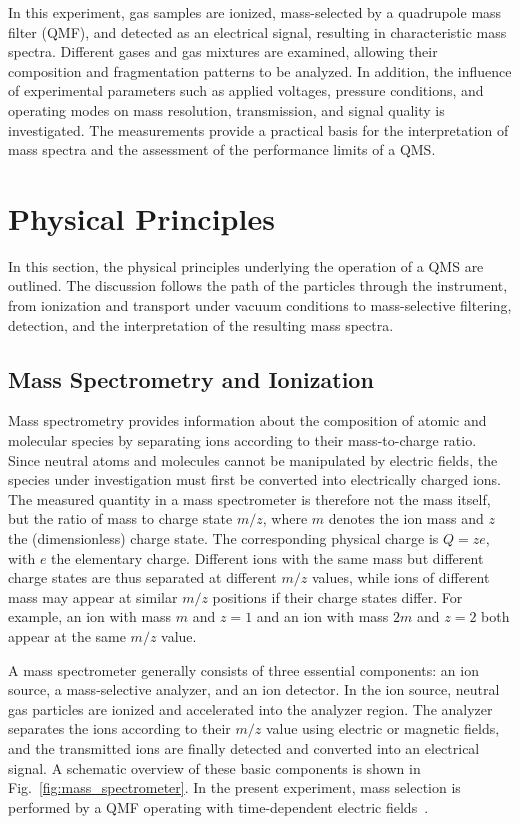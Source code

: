 \documentclass[a4paper]{article}
\begin{document}
In this experiment, gas samples are ionized, mass-selected by a quadrupole mass filter (QMF), and detected as an electrical signal, resulting in characteristic mass spectra.
Different gases and gas mixtures are examined, allowing their composition and fragmentation patterns to be analyzed.
In addition, the influence of experimental parameters such as applied voltages, pressure conditions, and operating modes on mass resolution, transmission, and signal quality is investigated.
The measurements provide a practical basis for the interpretation of mass spectra and the assessment of the performance limits of a QMS.

\section{Physical Principles}

In this section, the physical principles underlying the operation of a QMS are outlined.
The discussion follows the path of the particles through the instrument, from ionization and transport under vacuum conditions to mass-selective filtering, detection, and the interpretation of the resulting mass spectra.

\subsection{Mass Spectrometry and Ionization}

Mass spectrometry provides information about the composition of atomic and molecular species by separating ions according to their mass-to-charge ratio.
Since neutral atoms and molecules cannot be manipulated by electric fields, the species under investigation must first be converted into electrically charged ions.
The measured quantity in a mass spectrometer is therefore not the mass itself, but the ratio of mass to charge state $m/z$, where $m$ denotes the ion mass and $z$ the (dimensionless) charge state.
The corresponding physical charge is $Q = ze$, with $e$ the elementary charge.
Different ions with the same mass but different charge states are thus separated at different $m/z$ values, while ions of different mass may appear at similar $m/z$ positions if their charge states differ.
For example, an ion with mass $m$ and $z=1$ and an ion with mass $2m$ and $z=2$ both appear at the same $m/z$ value.

A mass spectrometer generally consists of three essential components: an ion source, a mass-selective analyzer, and an ion detector.
In the ion source, neutral gas particles are ionized and accelerated into the analyzer region.
The analyzer separates the ions according to their $m/z$ value using electric or magnetic fields, and the transmitted ions are finally detected and converted into an electrical signal.
A schematic overview of these basic components is shown in Fig.~\ref{fig:mass_spectrometer}.
In the present experiment, mass selection is performed by a QMF operating with time-dependent electric fields~\cite{QMSAnleitung}.
\end{document}
